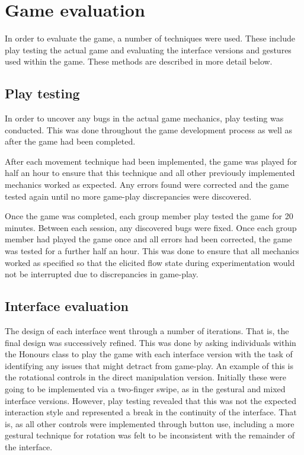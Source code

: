 \section{Game evaluation}
In order to evaluate the game, a number of techniques were used. These include play testing the actual game and evaluating the interface versions and gestures used within the game. These methods are described in more detail below.

\subsection{Play testing}
In order to uncover any bugs in the actual game mechanics, play testing was conducted. This was done throughout the game development process as well as after the game had been completed.

After each movement technique had been implemented, the game was played for half an hour to ensure that this technique and all other previously implemented mechanics worked as expected. Any errors found were corrected and the game tested again until no more game-play discrepancies were discovered.

Once the game was completed, each group member play tested the game for 20 minutes. Between each session, any discovered bugs were fixed. Once each group member had played the game once and all errors had been corrected, the game was tested for a further half an hour. This was done to ensure that all mechanics worked as specified so that the elicited flow state during experimentation would not be interrupted due to discrepancies in game-play.

\subsection{Interface evaluation}
The design of each interface went through a number of iterations. That is, the final design was successively refined. This was done by asking individuals within the Honours class to play the game with each interface version with the task of identifying any issues that might detract from game-play. An example of this is the rotational controls in the direct manipulation version. Initially these were going to be implemented via a two-finger swipe, as in the gestural and mixed interface versions. However, play testing revealed that this was not the expected interaction style and represented a break in the continuity of the interface. That is, as all other controls were implemented through button use, including a more gestural technique for rotation was felt to be inconsistent with the remainder of the interface.

